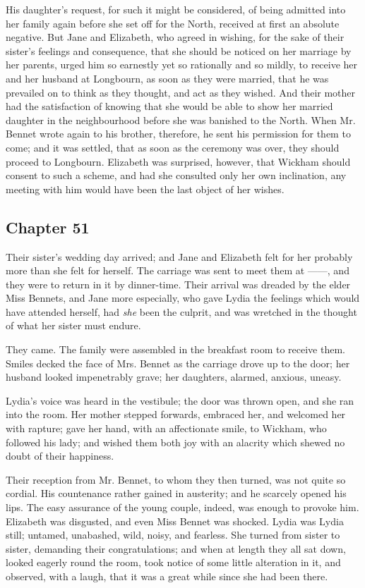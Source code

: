 His daughter's request, for such it might be considered, of being admitted into her family again before she set off for the North, received at first an absolute negative. But Jane and Elizabeth, who agreed in wishing, for the sake of their sister's feelings and consequence, that she should be noticed on her marriage by her parents, urged him so earnestly yet so rationally and so mildly, to receive her and her husband at Longbourn, as soon as they were married, that he was prevailed on to think as they thought, and act as they wished. And their mother had the satisfaction of knowing that she would be able to show her married daughter in the neighbourhood before she was banished to the North. When Mr. Bennet wrote again to his brother, therefore, he sent his permission for them to come; and it was settled, that as soon as the ceremony was over, they should proceed to Longbourn. Elizabeth was surprised, however, that Wickham should consent to such a scheme, and had she consulted only her own inclination, any meeting with him would have been the last object of her wishes.

\subsection[chapter-51]{\useURL[url51][][][]\from[url51] Chapter 51}

Their sister's wedding day arrived; and Jane and Elizabeth felt for her probably more than she felt for herself. The carriage was sent to meet them at ------, and they were to return in it by dinner-time. Their arrival was dreaded by the elder Miss Bennets, and Jane more especially, who gave Lydia the feelings which would have attended herself, had {\em she} been the culprit, and was wretched in the thought of what her sister must endure.

They came. The family were assembled in the breakfast room to receive them. Smiles decked the face of Mrs. Bennet as the carriage drove up to the door; her husband looked impenetrably grave; her daughters, alarmed, anxious, uneasy.

Lydia's voice was heard in the vestibule; the door was thrown open, and she ran into the room. Her mother stepped forwards, embraced her, and welcomed her with rapture; gave her hand, with an affectionate smile, to Wickham, who followed his lady; and wished them both joy with an alacrity which shewed no doubt of their happiness.

Their reception from Mr. Bennet, to whom they then turned, was not quite so cordial. His countenance rather gained in austerity; and he scarcely opened his lips. The easy assurance of the young couple, indeed, was enough to provoke him. Elizabeth was disgusted, and even Miss Bennet was shocked. Lydia was Lydia still; untamed, unabashed, wild, noisy, and fearless. She turned from sister to sister, demanding their congratulations; and when at length they all sat down, looked eagerly round the room, took notice of some little alteration in it, and observed, with a laugh, that it was a great while since she had been there.

